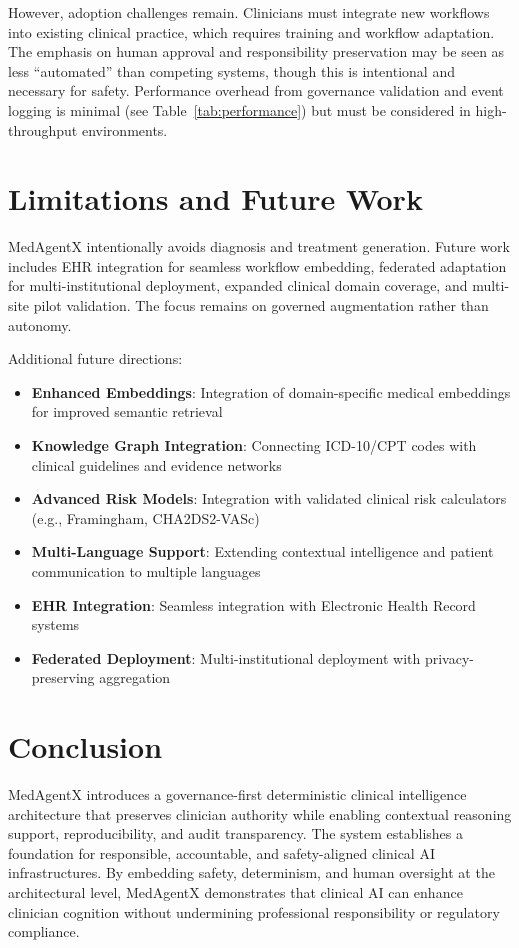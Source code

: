 \documentclass[conference]{IEEEtran}
\begin{document}
However, adoption challenges remain. Clinicians must integrate new workflows into existing clinical practice, which requires training and workflow adaptation. The emphasis on human approval and responsibility preservation may be seen as less ``automated'' than competing systems, though this is intentional and necessary for safety. Performance overhead from governance validation and event logging is minimal (see Table~\ref{tab:performance}) but must be considered in high-throughput environments.

\section{Limitations and Future Work}
MedAgentX intentionally avoids diagnosis and treatment generation. Future work includes EHR integration for seamless workflow embedding, federated adaptation for multi-institutional deployment, expanded clinical domain coverage, and multi-site pilot validation. The focus remains on governed augmentation rather than autonomy.

Additional future directions:
\begin{itemize}
    \item \textbf{Enhanced Embeddings}: Integration of domain-specific medical embeddings for improved semantic retrieval
    \item \textbf{Knowledge Graph Integration}: Connecting ICD-10/CPT codes with clinical guidelines and evidence networks
    \item \textbf{Advanced Risk Models}: Integration with validated clinical risk calculators (e.g., Framingham, CHA2DS2-VASc)
    \item \textbf{Multi-Language Support}: Extending contextual intelligence and patient communication to multiple languages
    \item \textbf{EHR Integration}: Seamless integration with Electronic Health Record systems
    \item \textbf{Federated Deployment}: Multi-institutional deployment with privacy-preserving aggregation
\end{itemize}

\section{Conclusion}
MedAgentX introduces a governance-first deterministic clinical intelligence architecture that preserves clinician authority while enabling contextual reasoning support, reproducibility, and audit transparency. The system establishes a foundation for responsible, accountable, and safety-aligned clinical AI infrastructures. By embedding safety, determinism, and human oversight at the architectural level, MedAgentX demonstrates that clinical AI can enhance clinician cognition without undermining professional responsibility or regulatory compliance.
\end{document}
